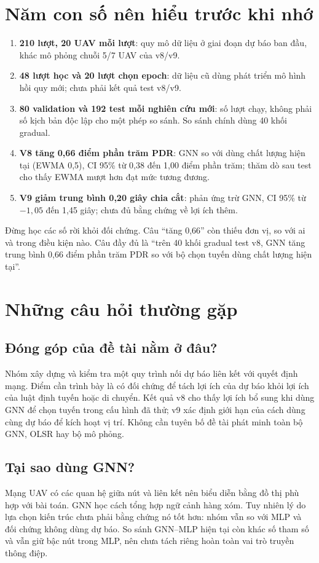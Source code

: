 \section{Năm con số nên hiểu trước khi nhớ}
\begin{enumerate}
\item \textbf{210 lượt, 20 UAV mỗi lượt}: quy mô dữ liệu ở giai đoạn dự báo ban đầu, khác mô phỏng chuỗi 5/7 UAV của v8/v9.
\item \textbf{48 lượt học và 20 lượt chọn epoch}: dữ liệu cũ dùng phát triển mô hình hồi quy mới; chưa phải kết quả test v8/v9.
\item \textbf{80 validation và 192 test mỗi nghiên cứu mới}: số lượt chạy, không phải số kịch bản độc lập cho một phép so sánh. So sánh chính dùng 40 khối gradual.
\item \textbf{V8 tăng 0,66 điểm phần trăm PDR}: GNN so với dùng chất lượng hiện tại (EWMA 0,5), CI 95\% từ 0,38 đến 1,00 điểm phần trăm; thăm dò sau test cho thấy EWMA mượt hơn đạt mức tương đương.
\item \textbf{V9 giảm trung bình 0,20 giây chia cắt}: phản ứng trừ GNN, CI 95\% từ $-1,05$ đến 1,45 giây; chưa đủ bằng chứng về lợi ích thêm.
\end{enumerate}

Đừng học các số rời khỏi đối chứng. Câu ``tăng 0,66'' còn thiếu đơn vị, so với ai và trong điều kiện nào. Câu đầy đủ là ``trên 40 khối gradual test v8, GNN tăng trung bình 0,66 điểm phần trăm PDR so với bộ chọn tuyến dùng chất lượng hiện tại''.

\section{Những câu hỏi thường gặp}
\subsection*{Đóng góp của đề tài nằm ở đâu?}
Nhóm xây dựng và kiểm tra một quy trình nối dự báo liên kết với quyết định mạng. Điểm cần trình bày là có đối chứng để tách lợi ích của dự báo khỏi lợi ích của luật định tuyến hoặc di chuyển. Kết quả v8 cho thấy lợi ích bổ sung khi dùng GNN để chọn tuyến trong cấu hình đã thử; v9 xác định giới hạn của cách dùng cùng dự báo để kích hoạt vị trí. Không cần tuyên bố đề tài phát minh toàn bộ GNN, OLSR hay bộ mô phỏng.

\subsection*{Tại sao dùng GNN?}
Mạng UAV có các quan hệ giữa nút và liên kết nên biểu diễn bằng đồ thị phù hợp với bài toán. GNN học cách tổng hợp ngữ cảnh hàng xóm. Tuy nhiên lý do lựa chọn kiến trúc chưa phải bằng chứng nó tốt hơn: nhóm vẫn so với MLP và đối chứng không dùng dự báo. So sánh GNN--MLP hiện tại còn khác số tham số và vẫn giữ bậc nút trong MLP, nên chưa tách riêng hoàn toàn vai trò truyền thông điệp.

